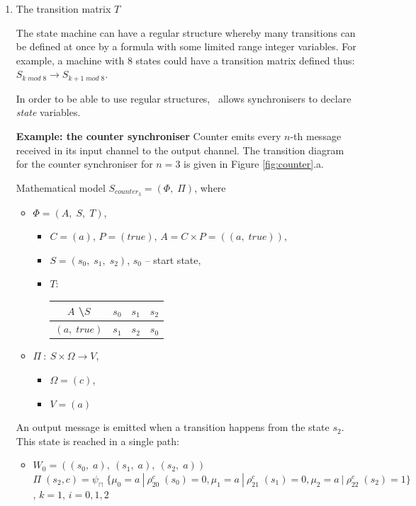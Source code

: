   \begin{enumerate}
  \item The transition matrix $T$

The state machine can have a regular structure whereby many transitions can be defined at once by a formula with some limited range integer variables. For example, a machine with 8 states could have a transition matrix defined thus: $S_{k \; mod \; 8} \to S_{k+1 \; mod \; 8}$.

In order to be able to use regular structures, \ak\ allows synchronisers to declare \emph{state} variables.

\textbf{Example: the counter synchroniser}  Counter emits every $n$-th message received in its input channel to the output channel. The transition diagram for the counter synchroniser for $n = 3$ is given in Figure \ref{fig:counter}.a.

Mathematical model $S_{counter_{3}} = (\Phi, \; \Pi)$, where
  \begin{itemize}
  \item[] $\Phi = (A, \; S, \; T)$,
    \begin{itemize}
    \item[] $C = (a)$, $P = (true)$, $A = C \times P = ((a, \; true))$,
    \item[] $S = (s_{0}, \; s_{1}, \; s_{2})$, $s_{0}$ -- start state,
    \item[] $T$:
      \begin{tabular}{c|c|c|c}
      $A$ \textbackslash $S$ & $s_{0}$ & $s_{1}$ & $s_{2}$\\
      \hline
      $(a, \; true)$ & $s_{1}$ & $s_{2}$ & $s_{0}$\\
      \end{tabular}
    \end{itemize}
  \item[] $\Pi \: : \: S \times \Omega \to V$,
    \begin{itemize}
    \item[] $\Omega = (c)$,
    \item[] $V = (a)$
    \end{itemize}
  \end{itemize}

An output message is emitted when a transition happens from the state $s_{2}$. This state is reached in a single path:
  \begin{itemize}
  \item[]
$W_{0} = ((s_{0}, \; a), \: (s_{1}, \; a), \: (s_{2}, \; a))$
$\Pi \; (s_{2}, c) = \psi_{\sqcap} \; \{\mu_{0} = a \: | \: \rho_{20}^{c} \; (s_{0}) = 0, \mu_{1} = a \: | \: \rho_{21}^{c} \; (s_{1}) = 0, \mu_{2} = a \: | \: \rho_{22}^{c} \; (s_{2}) = 1\}$, $k = 1$, $i = 0,1,2$ 
  \end{itemize}


\end{enumerate}
